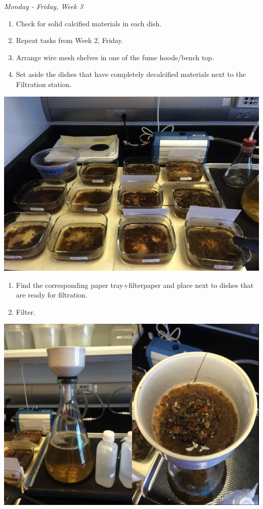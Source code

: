 \documentclass[
]{book}
\providecommand{\tightlist}{%
  \setlength{\itemsep}{0pt}\setlength{\parskip}{0pt}}
\begin{document}
\emph{Monday - Friday, Week 3}

\begin{enumerate}
\def\labelenumi{\arabic{enumi}.}
\tightlist
\item
  Check for solid calcified materials in each dish.
\item
  Repeat tasks from Week 2, Friday.
\item
  Arrange wire mesh shelves in one of the fume hoods/bench top.
\item
  Set aside the dishes that have completely decalcified materials next to the Filtration station.
\end{enumerate}

\includegraphics{images/DailyTasks12.jpg}

\begin{enumerate}
\def\labelenumi{\arabic{enumi}.}
\setcounter{enumi}{4}
\tightlist
\item
  Find the corresponding paper tray+filterpaper and place next to dishes that are ready for filtration.
\item
  Filter.
\end{enumerate}

\includegraphics{images/DailyTasks13.jpg}
\end{document}
